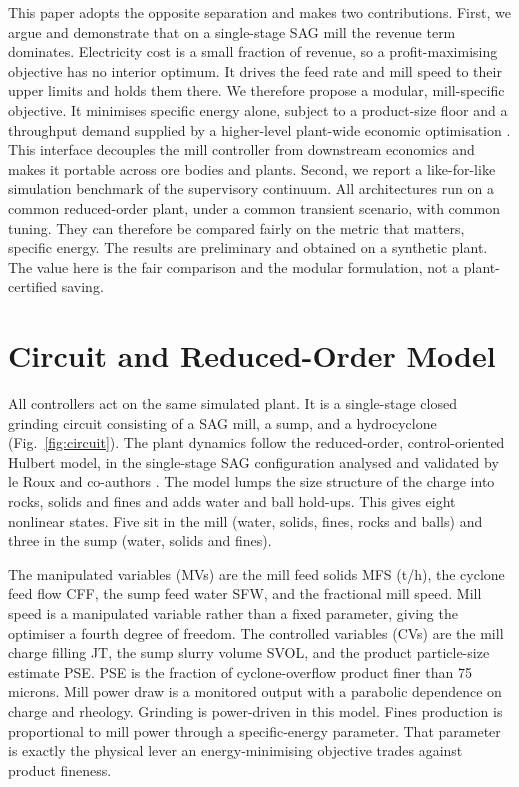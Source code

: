 \documentclass[conference]{IEEEtran}
\begin{document}
This paper adopts the opposite separation and makes two contributions.
First, we argue and demonstrate that on a single-stage SAG mill the
revenue term dominates. Electricity cost is a small fraction of revenue,
so a profit-maximising objective has no interior optimum. It drives the
feed rate and mill speed to their upper limits and holds them there. We
therefore propose a modular, mill-specific objective. It minimises
specific energy alone, subject to a product-size floor and a throughput
demand supplied by a higher-level plant-wide economic optimisation
\cite{leroux2019}. This interface decouples the mill controller from
downstream economics and makes it portable across ore bodies and plants.
Second, we report a like-for-like simulation benchmark of the supervisory
continuum. All architectures run on a common reduced-order plant, under a
common transient scenario, with common tuning. They can therefore be
compared fairly on the metric that matters, specific energy. The results
are preliminary and obtained on a synthetic plant. The value here is the
fair comparison and the modular formulation, not a plant-certified
saving.

\section{Circuit and Reduced-Order Model}

All controllers act on the same simulated plant. It is a single-stage
closed grinding circuit consisting of a SAG mill, a sump, and a
hydrocyclone (Fig.~\ref{fig:circuit}). The plant dynamics follow the reduced-order,
control-oriented Hulbert model, in the single-stage SAG configuration
analysed and validated by le Roux and co-authors \cite{leroux2013}. The
model lumps the size structure of the charge into rocks, solids and fines
and adds water and ball hold-ups. This gives eight nonlinear states. Five
sit in the mill (water, solids, fines, rocks and balls) and three in the
sump (water, solids and fines).

The manipulated variables (MVs) are the mill feed solids MFS (t/h), the
cyclone feed flow CFF, the sump feed water SFW, and the fractional mill
speed. Mill speed is a manipulated variable rather than a fixed parameter,
giving the optimiser a fourth degree of freedom. The controlled variables (CVs) are the mill charge
filling JT, the sump slurry volume SVOL, and the product particle-size
estimate PSE. PSE is the fraction of cyclone-overflow product finer
than 75 microns. Mill power draw is a monitored output with a parabolic dependence
on charge and rheology. Grinding is power-driven in this model. Fines
production is proportional to mill power through a specific-energy
parameter. That parameter is exactly the physical lever an
energy-minimising objective trades against product fineness.
\end{document}
